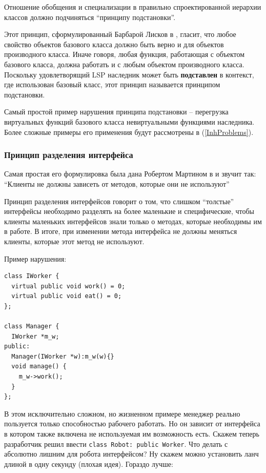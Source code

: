 \documentclass[a4paper,12pt,oneside]{article}
\begin{document}
Отношение обобщения и специализации в правильно спроектированной иерархии классов должно подчиняться ``принципу подстановки''. 

Этот принцип, сформулированный Барбарой Лисков в \cite{LSP}, гласит, что любое свойство объектов базового класса должно быть верно и для объектов производного класса. Иначе говоря, любая функция, работающая с объектом базового класса, должна работать и с любым объектом производного класса. Поскольку удовлетворящий LSP наследник может быть \textbf{подставлен} в контекст, где использован базовый класс, этот принцип называется принципом подстановки.

Самый простой пример нарушения принципа подстановки -- перегрузка виртуальных функций базового класса невиртуальными функциями наследника. Более сложные примеры его применения будут рассмотрены в (\ref{InhProblems}).

\subsubsection{Принцип разделения интерфейса}\label{ISP}

Самая простая его формулировка была дана Робертом Мартином в \cite{ISP} и звучит так: ``Клиенты не должны зависеть от методов, которые они не используют''

Принцип разделения интерфейсов говорит о том, что слишком ``толстые'' интерфейсы необходимо разделять на более маленькие и специфические, чтобы клиенты маленьких интерфейсов знали только о методах, которые необходимы им в работе. В итоге, при изменении метода интерфейса не должны меняться клиенты, которые этот метод не используют.

Пример нарушения:

\begin{lstlisting}
class IWorker {
  virtual public void work() = 0;
  virtual public void eat() = 0;
};

class Manager {
  IWorker *m_w;
public:
  Manager(IWorker *w):m_w(w){}
  void manage() {
    m_w->work();
  }
};
\end{lstlisting}

В этом исключительно сложном, но жизненном примере менеджер реально пользуется только способностью рабочего работать. Но он зависит от интерфейса в котором также включена не используемая им возможность есть. Скажем теперь разработчик решил ввести \lstinline!class Robot: public Worker!. Что делать с абсолютно лишним для робота интерфейсом? Ну скажем можно установить ланч длиной в одну секунду (плохая идея). Гораздо лучше:
\end{document}
